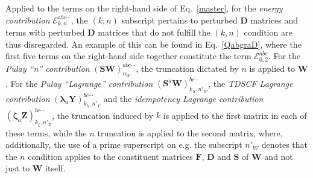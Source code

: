\documentclass[%
 reprint,
 amsmath,amssymb,
 aps,
]{revtex4-1}
\begin{document}
Applied to the terms on the right-hand side of Eq.~\eqref{master}, for the
\textit{energy contribution} $\mathcal{E}_{k,n}^{abc\cdots}$, the $(k,n)$
subscript pertains to perturbed $\mathbf{D}$ matrices and terms with perturbed
$\mathbf{D}$ matrices that do not fulfill the $(k,n)$ condition are thus
disregarded. An example of this can be found in Eq.~\eqref{QabgraD}, where the
first five terms on the right-hand side together constitute the term
$\mathcal{E}_{0,2}^{abc}$. For the \textit{Pulay ``n'' contribution}
$(\mathbf{SW})_{n_{W}}^{abc\cdots}$, the truncation dictated by $n$ is applied
to $\mathbf{W}$. For the \textit{Pulay ``Lagrange'' contribution}
$(\mathbf{S}^{a}\mathbf{W})_{k_{S},n'_{W}}^{bc\cdots}$, the \textit{TDSCF
Lagrange contribution}
$(\mathbf{\lambda}_{a}\mathbf{Y})_{k_{\lambda},n'_{Y}}^{bc\cdots}$ and the
\textit{idempotency Lagrange contribution}
$(\mathbf{\zeta}_{a}\mathbf{Z})_{k_{\zeta},n'_{Z}}^{bc\cdots}$, the truncation
induced by $k$ is applied to the first matrix in each of these terms, while the
$n$ truncation is applied to the second matrix, where, additionally, the use of
a prime superscript on e.g. the subscript $n'_{W}$ denotes that the $n$
condition applies to the constituent matrices $\mathbf{F}$, $\mathbf{D}$ and
$\mathbf{S}$ of $\mathbf{W}$ and not just to $\mathbf{W}$ itself.
\end{document}

